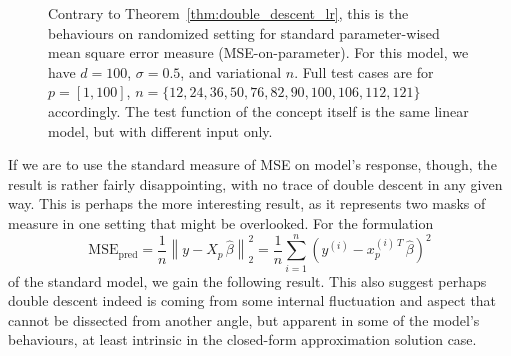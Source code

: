 \documentclass[10pt,oneside,oldfontcommands,dvipsnames,article]{memoir}
\begin{document}
\begin{figure}[htb]
  \caption{Contrary to Theorem~\ref{thm:double_descent_lr}, this is the behaviours on randomized setting for standard parameter-wised mean square error measure (MSE-on-parameter). For this model, we have $d=100$, $\sigma = 0.5$, and variational $n$. Full test cases are for $p=[1,100]$, $n=\{12,24,36,50,76,82,90,100,106,112,121\}$ accordingly. The test function of the concept itself is the same linear model, but with different input only.}
  \label{fig:11grid2}
\end{figure}
If we are to use the standard measure of MSE on model's response, though, the result is rather fairly disappointing, with no trace of double descent in any given way. This is perhaps the more interesting result, as it represents two masks of measure in one setting that might be overlooked. For the formulation
\begin{equation}
\mathrm{MSE}_{\mathrm{pred}}
=
\frac{1}{n}
\left\lVert
  y - X_{p}\,\hat\beta
\right\rVert_{2}^{2}
=
\frac{1}{n}
\sum_{i=1}^{n}
\left(
  y^{(i)} - x_{p}^{(i)\,T}\,\hat\beta
\right)^{2}
\end{equation}
of the standard model, we gain the following result. This also suggest perhaps double descent indeed is coming from some internal fluctuation and aspect that cannot be dissected from another angle, but apparent in some of the model's behaviours, at least intrinsic in the closed-form approximation solution case. 
\end{document}
